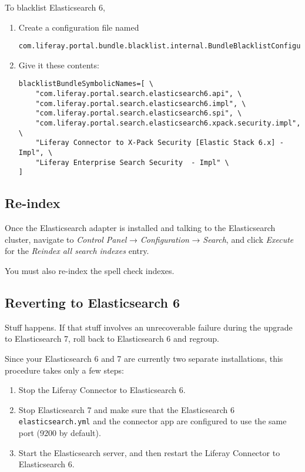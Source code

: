 To blacklist Elasticsearch 6,

\begin{enumerate}
\def\labelenumi{\arabic{enumi}.}
\item
  Create a configuration file named

\begin{verbatim}
com.liferay.portal.bundle.blacklist.internal.BundleBlacklistConfiguration.config
\end{verbatim}
\item
  Give it these contents:

\begin{verbatim}
blacklistBundleSymbolicNames=[ \
    "com.liferay.portal.search.elasticsearch6.api", \
    "com.liferay.portal.search.elasticsearch6.impl", \
    "com.liferay.portal.search.elasticsearch6.spi", \
    "com.liferay.portal.search.elasticsearch6.xpack.security.impl", \
    "Liferay Connector to X-Pack Security [Elastic Stack 6.x] - Impl", \
    "Liferay Enterprise Search Security  - Impl" \
]
\end{verbatim}
\end{enumerate}

\subsection{Re-index}\label{re-index}

Once the Elasticsearch adapter is installed and talking to the
Elasticsearch cluster, navigate to \emph{Control Panel} →
\emph{Configuration} → \emph{Search}, and click \emph{Execute} for the
\emph{Reindex all search indexes} entry.

You must also re-index the spell check indexes.

\subsection{Reverting to Elasticsearch
6}\label{reverting-to-elasticsearch-6}

Stuff happens. If that stuff involves an unrecoverable failure during
the upgrade to Elasticsearch 7, roll back to Elasticsearch 6 and
regroup.

Since your Elasticsearch 6 and 7 are currently two separate
installations, this procedure takes only a few steps:

\begin{enumerate}
\def\labelenumi{\arabic{enumi}.}
\item
  Stop the Liferay Connector to Elasticsearch 6.
\item
  Stop Elasticsearch 7 and make sure that the Elasticsearch 6
  \texttt{elasticsearch.yml} and the connector app are configured to use
  the same port (9200 by default).
\item
  Start the Elasticsearch server, and then restart the Liferay Connector
  to Elasticsearch 6.
\end{enumerate}

